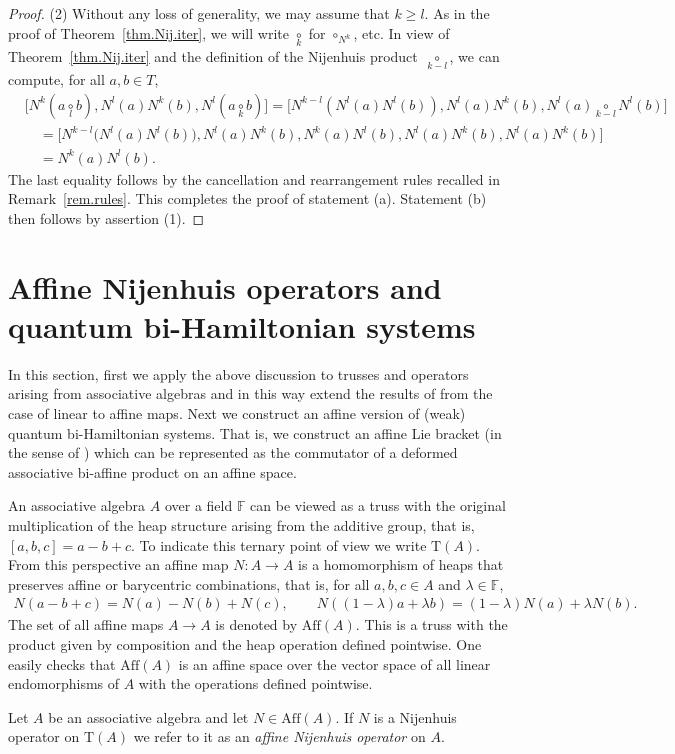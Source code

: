 \documentclass[10pt,a4paper]{amsart}
\numberwithin{equation}{section}
\newcommand{\F}{\mathbb F}
\def\nij#1{{\underset{#1}{\circ}}}
\begin{document}
\begin{proof}
 (2) Without any loss of generality, we may assume that $k\geq l$. As in the proof of Theorem~\ref{thm.Nij.iter}, we will write $\nij k$ for $\circ_{N^k}$, etc. In view of Theorem~\ref{thm.Nij.iter} and the definition of the Nijenhuis product~$\nij {k-l}$, we can compute, for all $a,b\in T$,
 \begin{align*}
 &\big[N^k(a\nij lb), N^l(a)N^k(b), N^l(a\nij k b)\big] = \big[N^{k-l}(N^l(a)N^l(b)),N^l(a)N^k(b), N^l(a)\nij {k-l} N^l(b) \big]\\
 &\quad= \big[N^{k-l}\big(N^l(a)N^l(b)\big),N^l(a)N^k(b), N^k(a)N^l(b), N^l(a)N^k(b), N^l(a)N^k(b)\big]\\
 &\quad= N^k(a)N^l(b).
 \end{align*}
The last equality follows by the cancellation and rearrangement rules recalled in Remark~\ref{rem.rules}. This completes the proof of statement (a). Statement (b) then follows by assertion (1).
\end{proof}


\section[Affine Nijenhuis operators and quantum bi-Hamiltonian systems]{Affine Nijenhuis operators and \\
quantum bi-Hamiltonian systems}\label{five}
In this section, first we apply the above discussion to trusses and operators arising from associative algebras and in this way extend the results of \cite{4} from the case of linear to affine maps. Next we construct an affine version of (weak) quantum bi-Hamiltonian systems. That is, we construct an affine Lie bracket (in the sense of \cite[Definition~1]{GraGra:Lie}) which can be represented as the commutator of a deformed associative bi-affine product on an affine space.

An associative algebra $A$ over a field $\F$ can be viewed as a truss with the original multiplication of the heap structure arising from the additive group, that is, $[a,b,c] = a-b+c$. To indicate this ternary point of view we write $\mathrm{T}(A)$. From this perspective an affine map $N\colon A\to A$ is a homomorphism of heaps that preserves affine or barycentric combinations, that is, for all $a,b,c\in A$ and $\lambda\in \F$,
\begin{align}\label{n.aff}
 N(a -b +c) = N(a)-N(b)+N(c), \qquad N((1-\lambda)a +\lambda b ) = (1-\lambda)N(a) + \lambda N(b).\!\!\!
\end{align}
The set of all affine maps $A\to A$ is denoted by $\mathrm{Aff}(A)$. This is a truss with the product given by composition and the heap operation defined pointwise. One easily checks that $\mathrm{Aff}(A)$ is an affine space over the vector space of all linear endomorphisms of $A$ with the operations defined pointwise.
\begin{Definition}\label{def.aff.Nij}
Let $A$ be an associative algebra and let $N\in \mathrm{Aff}(A)$. If $N$ is a Nijenhuis op\-er\-a\-tor on $\mathrm{T}(A)$ we refer to it as an \textit{affine Nijenhuis operator} on $A$.
\end{Definition}
\end{document}
